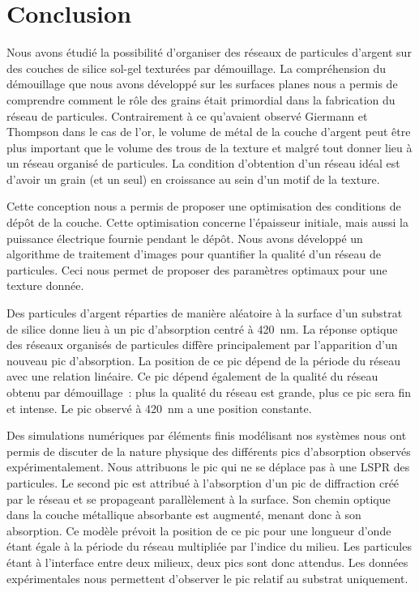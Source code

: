 \section{Conclusion}
Nous avons étudié la possibilité d'organiser des réseaux de particules d'argent sur des couches de silice sol-gel texturées par démouillage. La compréhension du démouillage que nous avons développé sur les surfaces planes nous a permis de comprendre comment le rôle des grains était primordial dans la fabrication du réseau de particules. Contrairement à ce qu'avaient observé Giermann et Thompson dans le cas de l'or, le volume de métal de la couche d'argent peut être plus important que le volume des trous de la texture et malgré tout donner lieu à un réseau organisé de particules. La condition d'obtention d'un réseau idéal est d'avoir un grain (et un seul) en croissance au sein d'un motif de la texture. \par 
Cette conception nous a permis de proposer une optimisation des conditions de dépôt de la couche. Cette optimisation concerne l'épaisseur initiale, mais aussi la puissance électrique fournie pendant le dépôt. Nous avons développé un algorithme de traitement d'images pour quantifier la qualité d'un réseau de particules. Ceci nous permet de proposer des paramètres optimaux pour une texture donnée.\par 
Des particules d'argent réparties de manière aléatoire à la surface d'un substrat de silice donne lieu à un pic d'absorption centré à 420~nm. La réponse optique des réseaux organisés de particules diffère principalement par l'apparition d'un nouveau pic d'absorption. La position de ce pic dépend de la période du réseau avec une relation linéaire. Ce pic dépend également de la qualité du réseau obtenu par démouillage~: plus la qualité du réseau est grande, plus ce pic sera fin et intense. Le pic observé à 420~nm a une position constante.\par 
Des simulations numériques par éléments finis modélisant nos systèmes nous ont permis de discuter de la nature physique des différents pics d'absorption observés expérimentalement. Nous attribuons le pic qui ne se déplace pas à une LSPR des particules. Le second pic est attribué à l'absorption d'un pic de diffraction créé par le réseau et se propageant parallèlement à la surface. Son chemin optique dans la couche métallique absorbante est augmenté, menant donc à son absorption. Ce modèle prévoit la position de ce pic pour une longueur d'onde étant égale à la période du réseau multipliée par l'indice du milieu. Les particules étant à l'interface entre deux milieux, deux pics sont donc attendus. Les données expérimentales nous permettent d'observer le pic relatif au substrat uniquement.\par \vspace{12pt}

